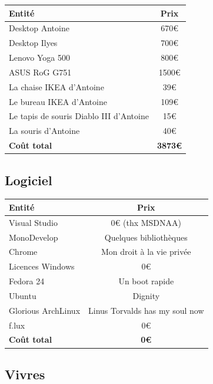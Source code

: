 \documentclass[12pt, a4paper]{article}
\begin{document}
\bigskip

\begin{center}
\begin{tabular}{|l|c|}
\hline
\bf Entité & \bf Prix \\
\hline 
Desktop Antoine & 670€\\
\hline
Desktop Ilyes & 700€ \\
\hline
Lenovo Yoga 500 & 800€\\
\hline
ASUS RoG G751 & 1500€ \\
\hline
La chaise IKEA d'Antoine & 39€ \\
\hline 
Le bureau IKEA d'Antoine & 109€ \\
\hline
Le tapis de souris Diablo III d'Antoine & 15€\\
\hline
La souris d'Antoine & 40€ \\
\hline
\bf Coût total & \bf 3873€\\
\hline
\end{tabular}
\end{center}

\subsection{Logiciel}

\bigskip

\begin{center}
\begin{tabular}{|l|c|}
\hline
\bf Entité & \bf Prix \\
\hline 
Visual Studio & 0€ (thx MSDNAA)\\
\hline
MonoDevelop & Quelques bibliothèques\\
\hline
Chrome & Mon droit à la vie privée \\ 
\hline
Licences Windows & 0€ \\
\hline
Fedora 24 & Un boot rapide\\
\hline
Ubuntu & Dignity \\
\hline 
Glorious ArchLinux & Linus Torvalds has my soul now \\
\hline
f.lux & 0€ \\
\hline
\bf Coût total & \bf 0€\\
\hline
\end{tabular}
\end{center}



\subsection{Vivres}
\end{document}
